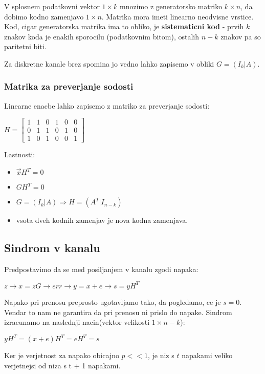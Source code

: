 \documentclass{article}
\begin{document}
\begin{multicols}{4}
V splosnem podatkovni vektor $1 \times k$ mnozimo z generatorsko matriko $k \times n$, da dobimo kodno zamenjavo
$1 \times n$. Matrika mora imeti linearno neodvisne vrstice. Kod, cigar generatorska matrika ima to obliko, je
\textbf{sistematicni kod} - prvih $k$ znakov koda je enakih sporocilu (podatkovnim bitom), ostalih $n-k$ znakov pa so
paritetni biti.

Za diskretne kanale brez spomina jo vedno lahko zapisemo v obliki $G = (I_k | A)$.

\subsubsection{Matrika za preverjanje sodosti}
Linearne enacbe lahko zapisemo z matriko za preverjanje sodosti:

\begin{center}
    \begin{math}
        H =
        \begin{bmatrix}
            1 & 1 & 0 & 1 & 0 & 0 \\
            0 & 1 & 1 & 0 & 1 & 0 \\
            1 & 0 & 1 & 0 & 0 & 1 
        \end{bmatrix}
    \end{math}
\end{center}

Lastnosti:
\begin{itemize}
    \item $\vec{x}H^T = 0$
    \item $GH^T = 0$
    \item $G = (I_k | A) \Rightarrow H = (A^T | I_{n-k})$
    \item vsota dveh kodnih zamenjav je nova kodna zamenjava.
\end{itemize}

\subsection{Sindrom v kanalu}
Predpostavimo da se med posiljanjem v kanalu zgodi napaka:
\begin{center}
    \begin{math}
        z \rightarrow x = zG \rightarrow err\rightarrow y = x + e \rightarrow s = yH^T
    \end{math}
\end{center}
Napako pri prenosu preprosto ugotavljamo tako, da pogledamo, ce je $s = 0$. Vendar to nam ne garantira da pri prenosu ni prislo do napake.
Sindrom izracunamo na naslednji nacin(vektor velikosti $1 \times n - k$):
\begin{center}
    \begin{math}
        yH^T = (x + e)H^T = eH^T = s
    \end{math}
\end{center}
Ker je verjetnost za napako obicajno $p << 1$, je niz s $t$ napakami veliko
verjetnejsi od niza s t + 1 napakami.


\end{multicols}
\end{document}
